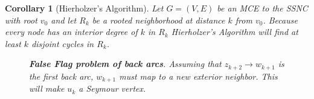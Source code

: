 \documentclass[AMS, Times1COL]{article} %
\newtheorem{corollary}[theorem]{Corollary}
\theoremstyle{definition}
\begin{document}
	\begin{corollary}[Hierholzer's Algorithm]
		Let $G=(V,E)$ be an MCE to the SSNC with root $v_0$ and let $R_k$ be a rooted neighborhood at distance $k$ from $v_0$. Because every node has an interior degree of $k$ in $R_k$ Hierholzer's Algorithm will find at least $k$ disjoint cycles in $R_k$.\label{hier}
	\end{corollary}
		
	\begin{figure}
		\centering
		\caption{\textit{\textbf{False Flag problem of back arcs}. Assuming that $z_{k+2} \to w_{k+1}$ is the first back arc, $w_{k+1}$ must map to a new exterior neighbor. This will make $u_k$ a Seymour vertex.} }\label{backexwk}
	\end{figure}
	
	
	
\end{document}
